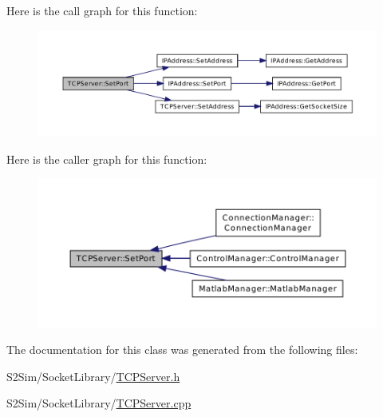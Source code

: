 Here is the call graph for this function\-:\nopagebreak
\begin{figure}[H]
\begin{center}
\leavevmode
\includegraphics[width=350pt]{class_t_c_p_server_a8d5ad30ba42960a84973b57f74a853fa_cgraph}
\end{center}
\end{figure}




Here is the caller graph for this function\-:\nopagebreak
\begin{figure}[H]
\begin{center}
\leavevmode
\includegraphics[width=350pt]{class_t_c_p_server_a8d5ad30ba42960a84973b57f74a853fa_icgraph}
\end{center}
\end{figure}




The documentation for this class was generated from the following files\-:\begin{DoxyCompactItemize}
\item 
S2\-Sim/\-Socket\-Library/\hyperlink{_t_c_p_server_8h}{T\-C\-P\-Server.\-h}\item 
S2\-Sim/\-Socket\-Library/\hyperlink{_t_c_p_server_8cpp}{T\-C\-P\-Server.\-cpp}\end{DoxyCompactItemize}
